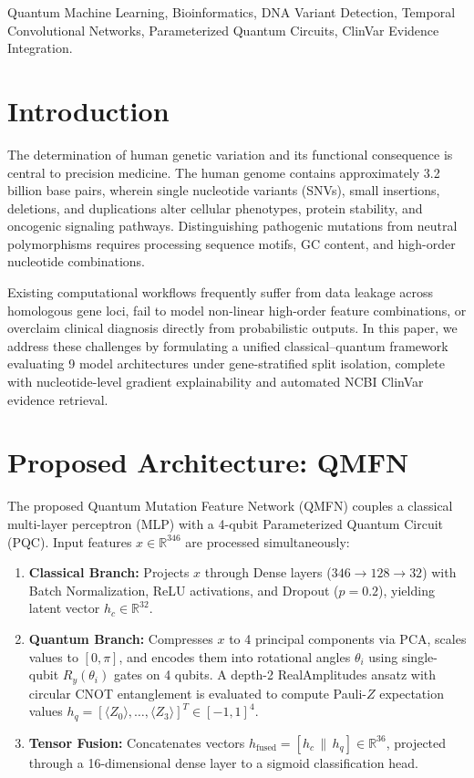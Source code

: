 \documentclass[conference]{IEEEtran}
\begin{document}
\begin{IEEEkeywords}
Quantum Machine Learning, Bioinformatics, DNA Variant Detection, Temporal Convolutional Networks, Parameterized Quantum Circuits, ClinVar Evidence Integration.
\end{IEEEkeywords}

\section{Introduction}
The determination of human genetic variation and its functional consequence is central to precision medicine. The human genome contains approximately 3.2 billion base pairs, wherein single nucleotide variants (SNVs), small insertions, deletions, and duplications alter cellular phenotypes, protein stability, and oncogenic signaling pathways. Distinguishing pathogenic mutations from neutral polymorphisms requires processing sequence motifs, GC content, and high-order nucleotide combinations.

Existing computational workflows frequently suffer from data leakage across homologous gene loci, fail to model non-linear high-order feature combinations, or overclaim clinical diagnosis directly from probabilistic outputs. In this paper, we address these challenges by formulating a unified classical--quantum framework evaluating 9 model architectures under gene-stratified split isolation, complete with nucleotide-level gradient explainability and automated NCBI ClinVar evidence retrieval.

\section{Proposed Architecture: QMFN}
The proposed Quantum Mutation Feature Network (QMFN) couples a classical multi-layer perceptron (MLP) with a 4-qubit Parameterized Quantum Circuit (PQC).
Input features $x \in \mathbb{R}^{346}$ are processed simultaneously:
\begin{enumerate}
    \item \textbf{Classical Branch:} Projects $x$ through Dense layers ($346 \to 128 \to 32$) with Batch Normalization, ReLU activations, and Dropout ($p=0.2$), yielding latent vector $h_c \in \mathbb{R}^{32}$.
    \item \textbf{Quantum Branch:} Compresses $x$ to 4 principal components via PCA, scales values to $[0, \pi]$, and encodes them into rotational angles $\theta_i$ using single-qubit $R_y(\theta_i)$ gates on 4 qubits. A depth-2 RealAmplitudes ansatz with circular CNOT entanglement is evaluated to compute Pauli-$Z$ expectation values $h_q = [\langle Z_0 \rangle, \dots, \langle Z_3 \rangle]^T \in [-1, 1]^4$.
    \item \textbf{Tensor Fusion:} Concatenates vectors $h_{\text{fused}} = [h_c \,\|\, h_q] \in \mathbb{R}^{36}$, projected through a 16-dimensional dense layer to a sigmoid classification head.
\end{enumerate}
\end{document}
